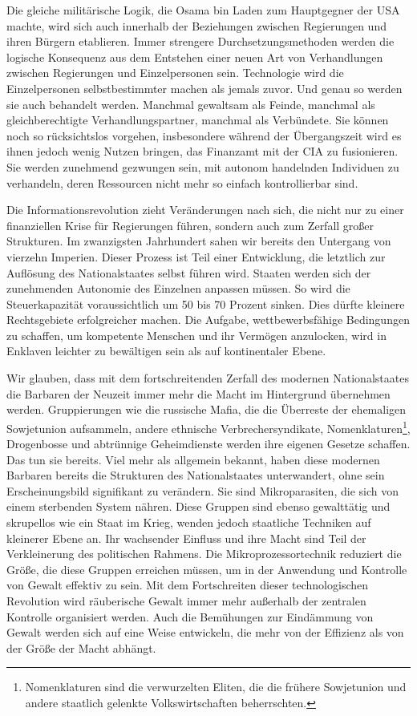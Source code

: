 \documentclass[
  a5paper,
  smalldemyvopaper,10pt,twoside,onecolumn,openright,extrafontsizes,hidelinks]{memoir}
\begin{document}
Die gleiche militärische Logik, die Osama bin Laden zum Hauptgegner der
USA machte, wird sich auch innerhalb der Beziehungen zwischen
Regierungen und ihren Bürgern etablieren. Immer strengere
Durchsetzungsmethoden werden die logische Konsequenz aus dem Entstehen
einer neuen Art von Verhandlungen zwischen Regierungen und
Einzelpersonen sein. Technologie wird die Einzelpersonen
selbstbestimmter machen als jemals zuvor. Und genau so werden sie auch
behandelt werden. Manchmal gewaltsam als Feinde, manchmal als
gleichberechtigte Verhandlungspartner, manchmal als Verbündete. Sie
können noch so rücksichtslos vorgehen, insbesondere während der
Übergangszeit wird es ihnen jedoch wenig Nutzen bringen, das Finanzamt
mit der CIA zu fusionieren. Sie werden zunehmend gezwungen sein, mit
autonom handelnden Individuen zu verhandeln, deren Ressourcen nicht mehr
so einfach kontrollierbar sind.

Die Informationsrevolution zieht Veränderungen nach sich, die nicht nur
zu einer finanziellen Krise für Regierungen führen, sondern auch zum
Zerfall großer Strukturen. Im zwanzigsten Jahrhundert sahen wir bereits
den Untergang von vierzehn Imperien. Dieser Prozess ist Teil einer
Entwicklung, die letztlich zur Auflösung des Nationalstaates selbst
führen wird. Staaten werden sich der zunehmenden Autonomie des Einzelnen
anpassen müssen. So wird die Steuerkapazität voraussichtlich um 50 bis
70 Prozent sinken. Dies dürfte kleinere Rechtsgebiete erfolgreicher
machen. Die Aufgabe, wettbewerbsfähige Bedingungen zu schaffen, um
kompetente Menschen und ihr Vermögen anzulocken, wird in Enklaven
leichter zu bewältigen sein als auf kontinentaler Ebene.

Wir glauben, dass mit dem fortschreitenden Zerfall des modernen
Nationalstaates die Barbaren der Neuzeit immer mehr die Macht im
Hintergrund übernehmen werden. Gruppierungen wie die russische Mafia,
die die Überreste der ehemaligen Sowjetunion aufsammeln, andere
ethnische Verbrechersyndikate, Nomenklaturen\footnote{Nomenklaturen sind
  die verwurzelten Eliten, die die frühere Sowjetunion und andere
  staatlich gelenkte Volkswirtschaften beherrschten.}, Drogenbosse und
abtrünnige Geheimdienste werden ihre eigenen Gesetze schaffen. Das tun
sie bereits. Viel mehr als allgemein bekannt, haben diese modernen
Barbaren bereits die Strukturen des Nationalstaates unterwandert, ohne
sein Erscheinungsbild signifikant zu verändern. Sie sind Mikroparasiten,
die sich von einem sterbenden System nähren. Diese Gruppen sind ebenso
gewalttätig und skrupellos wie ein Staat im Krieg, wenden jedoch
staatliche Techniken auf kleinerer Ebene an. Ihr wachsender Einfluss und
ihre Macht sind Teil der Verkleinerung des politischen Rahmens. Die
Mikroprozessortechnik reduziert die Größe, die diese Gruppen erreichen
müssen, um in der Anwendung und Kontrolle von Gewalt effektiv zu sein.
Mit dem Fortschreiten dieser technologischen Revolution wird räuberische
Gewalt immer mehr außerhalb der zentralen Kontrolle organisiert werden.
Auch die Bemühungen zur Eindämmung von Gewalt werden sich auf eine Weise
entwickeln, die mehr von der Effizienz als von der Größe der Macht
abhängt.
\end{document}
